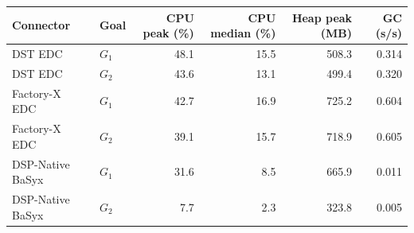 \begin{tabular}{llrrrr}
    \toprule
    Connector & Goal & CPU peak (\%) & CPU median (\%) & Heap peak (MB) & GC (s/s) \\
    \midrule
    DST EDC & $G_1$ & 48.1 & 15.5 & 508.3 & 0.314 \\
    DST EDC & $G_2$ & 43.6 & 13.1 & 499.4 & 0.320 \\
    Factory-X EDC & $G_1$ & 42.7 & 16.9 & 725.2 & 0.604 \\
    Factory-X EDC & $G_2$ & 39.1 & 15.7 & 718.9 & 0.605 \\
    DSP-Native BaSyx & $G_1$ & 31.6 & 8.5 & 665.9 & 0.011 \\
    DSP-Native BaSyx & $G_2$ & 7.7 & 2.3 & 323.8 & 0.005 \\
    \bottomrule
\end{tabular}
